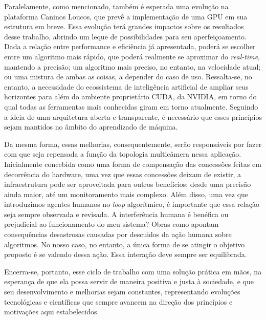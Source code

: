\documentclass[]{politex}
\begin{document}
Paralelamente, como mencionado, também é esperada uma evolução na plataforma Caninos Loucos, que prevê a implementação de uma GPU em sua estrutura em breve. Essa evolução terá grandes impactos sobre os resultados desse trabalho, abrindo um leque de possibilidades para seu aperfeiçoamento. Dada a relação entre performance e eficiência já apresentada, poderá se escolher entre um algoritmo mais rápido, que poderá realmente se aproximar do \textit{real-time}, mantendo a precisão; um algoritmo mais preciso, no entanto, na velocidade atual; ou uma mistura de ambas as coisas, a depender do caso de uso. Ressalta-se, no entanto, a necessidade do ecossistema de inteligência artificial de ampliar seus horizontes para além do ambiente proprietário CUDA, da NVIDIA, em torno do qual todas as ferramentas mais conhecidas giram em torno atualmente. Seguindo a ideia de uma arquitetura aberta e transparente, é necessário que esses princípios sejam mantidos no âmbito do aprendizado de máquina.

Da mesma forma, essas melhorias, consequentemente, serão responsáveis por fazer com que seja repensada a função da topologia multicâmera nessa aplicação. Inicialmente concebida como uma forma de compensação das concessões feitas em decorrência do hardware, uma vez que essas concessões deixam de existir, a infraestrutura pode ser aproveitada para outros benefícios: desde uma precisão ainda maior, até um monitoramento mais complexo. Além disso, uma vez que introduzimos agentes humanos no \textit{loop} algorítmico, é importante que essa relação seja sempre observada e revisada. A interferência humana é benéfica ou prejudicial ao funcionamento do meu sistema? Obras como \citeyear{wmd} \citeauthor{wmd} apontam consequências desastrosas causadas por descuidos da ação humana sobre algoritmos. No nosso caso, no entanto, a única forma de se atingir o objetivo proposto é se valendo dessa ação. Essa interação deve sempre ser equilibrada.

Encerra-se, portanto, esse ciclo de trabalho com uma solução prática em mãos, na esperança de que ela possa servir de maneira positiva e justa à sociedade, e que seu desenvolvimento e melhorias sejam constantes, representando evoluções tecnológicas e científicas que sempre avancem na direção dos princípios e motivações aqui estabelecidos.

%


\end{document}
